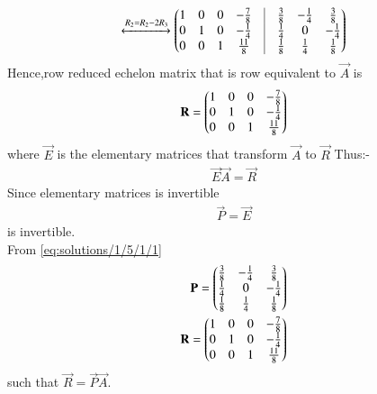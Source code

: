 \begin{align}
\xleftrightarrow{R_2=R_2-2R_3}\myvec{1&0&0&-\frac{7}{8}&\vrule&\frac{3}{8}&-\frac{1}{4}&\frac{3}{8}\\0&1&0&-\frac{1}{4}&\vrule&\frac{1}{4}&0&-\frac{1}{4}\\0&0&1&\frac{11}{8}&\vrule&\frac{1}{8}&\frac{1}{4}&\frac{1}{8}}\label{eq:solutions/1/5/1/1}
\end{align}
Hence,row reduced echelon matrix that is row equivalent to $\vec{A}$ is 
\begin{align}
\mathbf{R}=\begin{pmatrix}1&0&0&-\frac{7}{8}\\0&1&0&-\frac{1}{4}\\0&0&1&\frac{11}{8}\end{pmatrix}
\end{align}
where $\vec{E}$ is the elementary matrices that transform $\vec{A}$ to $\vec{R}$ Thus:-
\begin{align}
 \vec{E}\vec{A}=\vec{R}  
\end{align}
Since elementary matrices is invertible
\begin{align}
  \vec{P}=\vec{E} 
\end{align}
is invertible.\\
From \eqref{eq:solutions/1/5/1/1}
\begin{align}
\mathbf{P}=\begin{pmatrix}\frac{3}{8}&-\frac{1}{4}&\frac{3}{8}\\\frac{1}{4}&0&-\frac{1}{4}\\\frac{1}{8}&\frac{1}{4}&\frac{1}{8}\end{pmatrix}\\
\mathbf{R}=\begin{pmatrix}1&0&0&-\frac{7}{8}\\0&1&0&-\frac{1}{4}\\0&0&1&\frac{11}{8}\end{pmatrix}
\end{align}
such that $\vec{R}=\vec{P}\vec{A}$.
